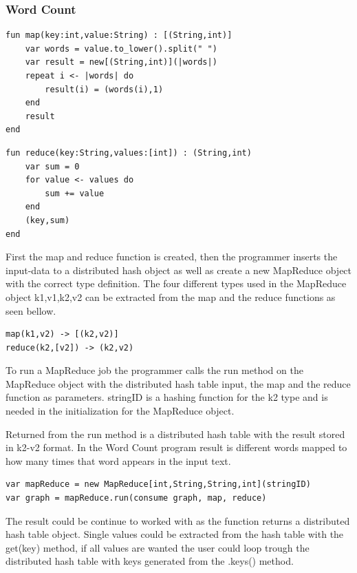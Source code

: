 \subsubsection{Word Count}
\begin{lstlisting}
fun map(key:int,value:String) : [(String,int)]
    var words = value.to_lower().split(" ")
    var result = new[(String,int)](|words|)
    repeat i <- |words| do
        result(i) = (words(i),1)
    end
    result
end
\end{lstlisting}
\begin{lstlisting}
fun reduce(key:String,values:[int]) : (String,int)
    var sum = 0
    for value <- values do
        sum += value
    end
    (key,sum)
end
\end{lstlisting}

First the map and reduce function is created, then the programmer inserts the input-data to a distributed hash object as well as create a new MapReduce object with the correct type definition. The four different types used in the MapReduce object k1,v1,k2,v2 can be extracted from the map and the reduce functions as seen bellow.

\begin{lstlisting}
map(k1,v2) -> [(k2,v2)]
reduce(k2,[v2]) -> (k2,v2)
\end{lstlisting}

To run a MapReduce job the programmer calls the run method on the MapReduce object with the distributed hash table input, the map and the reduce function as parameters. stringID is a hashing function for the k2 type and is needed in the initialization for the MapReduce object. 

Returned from the run method is a distributed hash table with the result stored in k2-v2 format. In the Word Count program result is different words mapped to how many times that word appears in the input text. 

\begin{lstlisting}
var mapReduce = new MapReduce[int,String,String,int](stringID)
var graph = mapReduce.run(consume graph, map, reduce)
\end{lstlisting}

The result could be continue to worked with as the function returns a distributed hash table object. Single values could be extracted from the hash table with the get(key) method, if all values are wanted the user could loop trough the distributed hash table with keys generated from the .keys() method. 
\pagebreak

